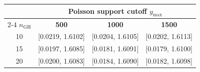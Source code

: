 \begin{tabular}{c c c c}
\toprule
& \multicolumn{3}{c}{\textbf{Poisson support cutoff $y_{\max}$}} \\
\cmidrule(lr){2-4}
\textbf{$n_{\text{GH}}$} & \textbf{500} & \textbf{1000} & \textbf{1500} \\
\midrule
10 & [0.0219, 1.6102] & [0.0204, 1.6105] & [0.0202, 1.6113] \\
15 & [0.0197, 1.6085] & [0.0181, 1.6091] & [0.0179, 1.6100] \\
20 & [0.0200, 1.6083] & [0.0184, 1.6090] & [0.0182, 1.6098] \\
\bottomrule
\end{tabular}
